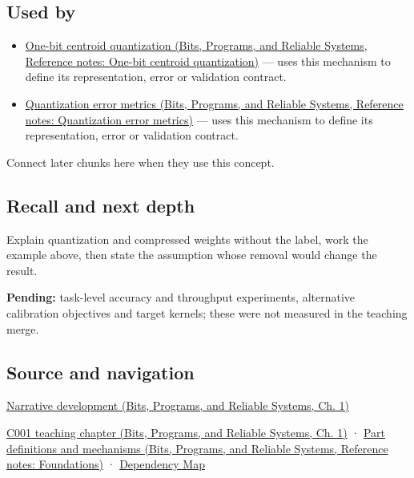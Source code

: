 \subsection{Used by}\label{appendix-fdc7879e8bf2-used-by}

\hypertarget{appendix-fdc7879e8bf2-used-by}{}

\begin{itemize}
\tightlist
\item
  \href{../01-Bits-Programs-and-Reliable-Systems/main.pdf\#nameddest=appendix-4ccd7a775813}{One-bit centroid quantization (Bits, Programs, and Reliable Systems, Reference notes: One-bit centroid quantization)} --- uses this mechanism to define its representation, error or validation contract.
\item
  \href{../01-Bits-Programs-and-Reliable-Systems/main.pdf\#nameddest=appendix-537171d69d27}{Quantization error metrics (Bits, Programs, and Reliable Systems, Reference notes: Quantization error metrics)} --- uses this mechanism to define its representation, error or validation contract.
\end{itemize}

Connect later chunks here when they use this concept.

\subsection{Recall and next depth}\label{appendix-fdc7879e8bf2-recall-and-next-depth}

\hypertarget{appendix-fdc7879e8bf2-recall-and-next-depth}{}

Explain quantization and compressed weights without the label, work the example above, then state the assumption whose removal would change the result.

\textbf{Pending:} task-level accuracy and throughput experiments, alternative calibration objectives and target kernels; these were not measured in the teaching merge.

\subsection{Source and navigation}\label{appendix-fdc7879e8bf2-source-and-navigation}

\hypertarget{appendix-fdc7879e8bf2-source-and-navigation}{}

\href{../01-Bits-Programs-and-Reliable-Systems/main.pdf\#nameddest=01-foundations-i-ch001-choosing-what-information-to-keep}{Narrative development (Bits, Programs, and Reliable Systems, Ch. 1)}

\href{../01-Bits-Programs-and-Reliable-Systems/main.pdf\#nameddest=01-foundations-i-ch001-from-a-signal-to-an-interpretation}{C001 teaching chapter (Bits, Programs, and Reliable Systems, Ch. 1)} · \href{../01-Bits-Programs-and-Reliable-Systems/main.pdf\#nameddest=appendix-fd090d982a15}{Part definitions and mechanisms (Bits, Programs, and Reliable Systems, Reference notes: Foundations)} · \hyperref[appendix-4ad47bdd269a]{Dependency Map}
